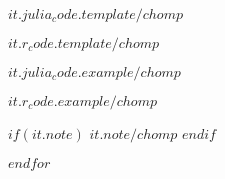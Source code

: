 \putin{\end{minipage}}

\smallskip
$it.julia_code.template/chomp$

\putin{\end{minipage}}

\smallskip
$it.r_code.template/chomp$

\putin{\end{minipage}}


\small
$it.julia_code.example/chomp$ 

\putin{\end{minipage}}

$it.r_code.example/chomp$

\putin{\end{minipage}}

$if(it.note)$
\footnotesize \emph{$it.note/chomp$}
\small
$endif$

$endfor$

